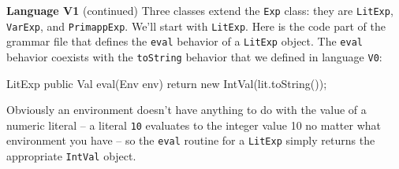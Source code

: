 \begin{minipage}[t]{\sw}
\slidenumber
\LARGE
{\bf Language V1} (continued)\exx
Three classes extend the \verb'Exp' class: they are
\verb'LitExp', \verb'VarExp', and \verb'PrimappExp'.
We'll start with \verb'LitExp'.
Here is the code part of the grammar file
that defines the \verb'eval' behavior of a \verb'LitExp' object.
The \verb'eval' behavior coexists with the \verb'toString' behavior
that we defined in language \verb'V0':
\begin{qv}
LitExp
    public Val eval(Env env) {
        return new IntVal(lit.toString());
    }
\end{qv}
Obviously an environment doesn't have anything to do
with the value of a numeric literal --
a literal \verb'10' evaluates to the integer value 10
no matter what environment you have --
so the \verb'eval' routine for a \verb'LitExp'
simply returns the appropriate \verb'IntVal' object.
\end{minipage}
